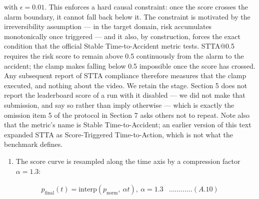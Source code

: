 with \(\epsilon = 0.01\). This enforces a hard causal constraint: once the score crosses the alarm boundary, it cannot fall back below it. The constraint is motivated by the irreversibility assumption --- in the target domain, risk accumulates monotonically once triggered --- and it also, by construction, forces the exact condition that the official Stable Time-to-Accident metric tests. STTA@0.5 requires the risk score to remain above 0.5 continuously from the alarm to the accident; the clamp makes falling below 0.5 impossible once the score has crossed. Any subsequent report of STTA compliance therefore measures that the clamp executed, and nothing about the video. We retain the stage. Section 5 does not report the leaderboard score of a run with it disabled --- we did not make that submission, and say so rather than imply otherwise --- which is exactly the omission item 5 of the protocol in Section 7 asks others not to repeat. Note also that the metric's name is Stable Time-to-Accident; an earlier version of this text expanded STTA as Score-Triggered Time-to-Action, which is not what the benchmark defines.

\begin{enumerate}
\def\labelenumi{\arabic{enumi}.}
\setcounter{enumi}{4}
\item
  The score curve is resampled along the time axis by a compression factor \(\alpha = 1.3\):
\end{enumerate}

\[\begin{matrix}
 & p_{\text{final}}(t) = \text{interp}\left( p_{\text{norm}},\ \alpha t \right),\ \alpha = 1.3 & \ldots\ldots\ldots\ldots(A.10) & 
\end{matrix}
\]

